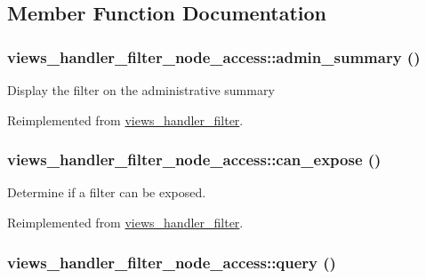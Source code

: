 \subsection{Member Function Documentation}
\hypertarget{classviews__handler__filter__node__access_2f3abe4aa9418904e52937d1549fd560}{
\subsubsection[{admin\_\-summary}]{\setlength{\rightskip}{0pt plus 5cm}views\_\-handler\_\-filter\_\-node\_\-access::admin\_\-summary ()}}
\label{classviews__handler__filter__node__access_2f3abe4aa9418904e52937d1549fd560}


Display the filter on the administrative summary 

Reimplemented from \hyperlink{classviews__handler__filter_655263cd0b73188eec064b9a9743fe4c}{views\_\-handler\_\-filter}.\hypertarget{classviews__handler__filter__node__access_20eacba1b9be3c0e6b8245191b60a9ff}{
\subsubsection[{can\_\-expose}]{\setlength{\rightskip}{0pt plus 5cm}views\_\-handler\_\-filter\_\-node\_\-access::can\_\-expose ()}}
\label{classviews__handler__filter__node__access_20eacba1b9be3c0e6b8245191b60a9ff}


Determine if a filter can be exposed. 

Reimplemented from \hyperlink{classviews__handler__filter_f0e5810a2a2f194cd6af0fca9c858756}{views\_\-handler\_\-filter}.\hypertarget{classviews__handler__filter__node__access_b7f054a6a94abf2f41ce70fd40cf2e5e}{
\subsubsection[{query}]{\setlength{\rightskip}{0pt plus 5cm}views\_\-handler\_\-filter\_\-node\_\-access::query ()}}
\label{classviews__handler__filter__node__access_b7f054a6a94abf2f41ce70fd40cf2e5e}


